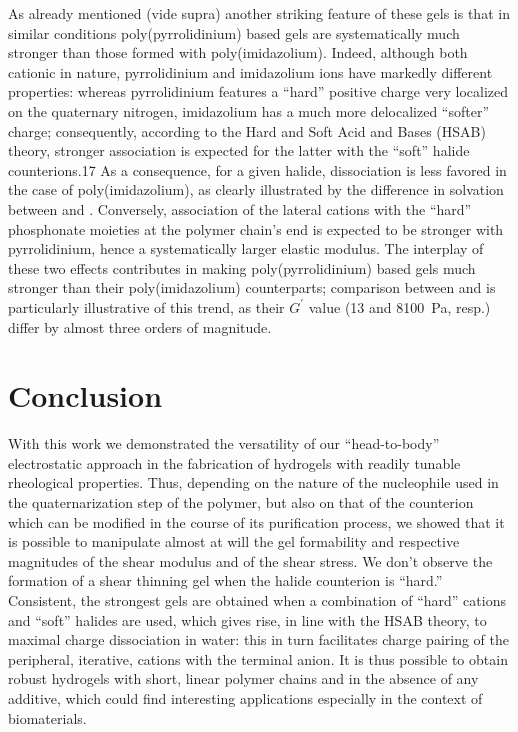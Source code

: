 \documentclass[journal=jacsat,manuscript=article]{achemso}
\begin{document}
As already mentioned (vide supra) another striking feature of these gels is that in similar conditions poly(pyrrolidinium) based gels are systematically much stronger than those formed with poly(imidazolium). Indeed, although both cationic in nature, pyrrolidinium and imidazolium ions have markedly different properties: whereas pyrrolidinium features a ``hard'' positive charge very localized on the quaternary nitrogen, imidazolium has a much more delocalized ``softer'' charge; consequently, according to the Hard and Soft Acid and Bases (HSAB) theory, stronger association is expected for the latter with the ``soft'' halide counterions.17 As a consequence, for a given halide, dissociation is less favored in the case of poly(imidazolium), as clearly illustrated by the difference in solvation between  and . Conversely, association of the lateral cations with the ``hard'' phosphonate moieties at the polymer chain’s end is expected to be stronger with pyrrolidinium, hence a systematically larger elastic modulus. The interplay of these two effects contributes in making poly(pyrrolidinium) based gels much stronger than their poly(imidazolium) counterparts; comparison between  and  is particularly illustrative of this trend, as their $G^\prime$ value (13 and \SI{8100}{\pascal}, resp.) differ by almost three orders of magnitude.

\section{Conclusion}
With this work we demonstrated the versatility of our ``head-to-body'' electrostatic approach in the fabrication of hydrogels with readily tunable rheological properties. Thus, depending on the nature of the nucleophile used in the quaternarization step of the polymer, but also on that of the counterion which can be modified in the course of its purification process, we showed that it is possible to manipulate almost at will the gel formability and respective magnitudes of the shear modulus and of the shear stress. We don’t observe the formation of a shear thinning gel when the halide counterion is ``hard.'' Consistent, the strongest gels are obtained when a combination of ``hard'' cations and ``soft'' halides are used, which gives rise, in line with the HSAB theory, to maximal charge dissociation in water: this in turn facilitates charge pairing of the peripheral, iterative, cations with the terminal anion. It is thus possible to obtain robust hydrogels with short, linear polymer chains and in the absence of any additive, which could find interesting applications especially in the context of biomaterials.
\end{document}
